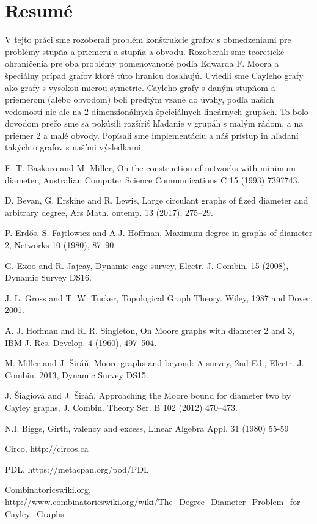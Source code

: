 \documentclass[a4paper,12pt,oneside]{report}%
\begin{document}
\newpage
\section{Resum\'e}
V tejto pr\'aci sme rozoberali probl\'em kon\v{s}trukcie grafov s obmedzeniami pre probl\'emy stup\v{n}a a priemeru a stup\v{n}a a obvodu. Rozoberali sme teoretick\'e ohrani\v{c}enia pre oba probl\'emy pomenovanon\'e pod\v{l}a Edwarda F. Moora a \v{s}peci\'alny pr\'ipad grafov ktor\'e t\'uto hranicu dosahuj\'u. Uviedli sme Cayleho grafy ako grafy s vysokou mierou symetrie. Cayleho grafy s dan\'ym stup\v{n}om a priemerom (alebo obvodom) boli predt\'ym vzan\'e do \'uvahy, pod\v{l}a na\v{s}ich vedomost\'i nie ale na $2$-dimenzion\'alnych \v{s}peici\'alnych line\'arnych grup\'ach. To bolo dovodom pre\v{c}o sme sa pok\'usili roz\v{s}\'iri\v{t} h\v{l}adanie v grup\'ah s mal\'ym r\'adom, a na priemer 2 a mal\'e obvody. Pop\'isali sme implement\'aciu a n\'a\v{s} pr\'istup in h\v{l}adan\'i tak\'ychto grafov s na\v{s}\'imi v\'ysledkami.

\begin{thebibliography}{xx}

 E. T. Baskoro and M. Miller, On the construction of networks with minimum diameter,
Australian Computer Science Communications C 15 (1993) 739?743.

 D. Bevan, G. Erskine and R. Lewis, Large circulant graphs of fized diameter and arbitrary degree, Ars Math. ontemp. 13 (2017), 275--29.

 P. Erd{\H o}s, S. Fajtlowicz and A.J. Hoffman,
Maximum degree in graphs of diameter 2, Networks 10
(1980), 87--90.

 G. Exoo and R. Jajcay, Dynamic cage survey, Electr. J. Combin. 15 (2008), Dynamic Survey DS16.

 J. L. Gross and T. W. Tucker, Topological Graph Theory. Wiley, 1987 and Dover, 2001.

 A. J. Hoffman and R. R. Singleton, On Moore graphs with diameter $2$ and $3$, IBM J. Res. Develop. 4 (1960), 497--504.

 M. Miller and J. \v{S}ir\'a\v{n},  Moore graphs and beyond: A survey, 2nd Ed., Electr. J. Combin. 2013, Dynamic Survey DS15.

 J. \v{S}iagiov\'a and J. \v{S}ir\'a\v{n}, Approaching the Moore bound for diameter two by Cayley graphs, J. Combin. Theory Ser. B 102 (2012) 470--473.

 N.I. Biggs, Girth, valency and excess, Linear Algebra Appl. 31 (1980) 55-59

 Circo, http://circos.ca

 PDL, https://metacpan.org/pod/PDL

 Combinatoricswiki.org, http://www.combinatoricswiki.org/wiki/The\_Degree\_Diameter\_Problem\_for\_Cayley\_Graphs 

\end{thebibliography}
\end{document}
